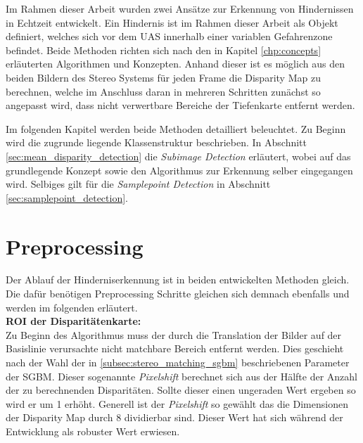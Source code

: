 Im Rahmen dieser Arbeit wurden zwei Ansätze zur Erkennung von Hindernissen in Echtzeit entwickelt. Ein Hindernis ist im Rahmen dieser Arbeit als Objekt definiert, welches sich vor dem UAS innerhalb einer variablen Gefahrenzone befindet. Beide Methoden richten sich nach den in Kapitel \ref{chp:concepts} erläuterten Algorithmen und Konzepten. Anhand dieser ist es möglich aus den beiden Bildern des Stereo Systems für jeden Frame die Disparity Map zu berechnen, welche im Anschluss daran in mehreren Schritten zunächst so angepasst wird, dass nicht verwertbare Bereiche der Tiefenkarte entfernt werden.

\noindent
Im folgenden Kapitel werden beide Methoden detailliert beleuchtet. Zu Beginn wird die zugrunde liegende Klassenstruktur beschrieben. In Abschnitt \ref{sec:mean_disparity_detection} die \emph{Subimage Detection} erläutert, wobei auf das grundlegende Konzept sowie den Algorithmus zur Erkennung selber eingegangen wird. Selbiges gilt für die \emph{Samplepoint Detection} in Abschnitt \ref{sec:samplepoint_detection}.


\section{Preprocessing}
\label{sec:preprocessing}
Der Ablauf der Hinderniserkennung ist in beiden entwickelten Methoden gleich. Die dafür benötigen Preprocessing Schritte gleichen sich demnach ebenfalls und werden im folgenden erläutert.\\

\noindent
\textbf{ROI der Disparitätenkarte:}\\
Zu Beginn des Algorithmus muss der durch die Translation der Bilder auf der Basislinie verursachte nicht matchbare Bereich entfernt werden. Dies geschieht nach der Wahl der in \ref{subsec:stereo_matching_sgbm} beschriebenen Parameter der SGBM. Dieser sogenannte \emph{Pixelshift} berechnet sich aus der Hälfte der Anzahl der zu berechnenden Disparitäten. Sollte dieser einen ungeraden Wert ergeben so wird er um 1 erhöht. Generell ist der \emph{Pixelshift} so gewählt das die Dimensionen der Disparity Map durch 8 dividierbar sind. Dieser Wert hat sich während der Entwicklung als robuster Wert erwiesen.\\

